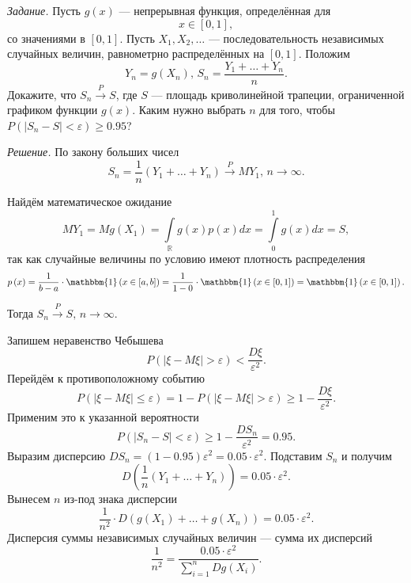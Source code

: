 \textit{Задание.}
Пусть $g \left( x \right) $ --- непрерывная функция, определённая для
$$x \in
  \left[ 0, 1 \right],$$
со значениями в $ \left[ 0, 1 \right]$.
Пусть $X_1, X_2, \dotsc $ --- последовательность независимых случайных величин,
равнометрно распределённых на $ \left[ 0, 1 \right]$.
Положим
$$Y_n = g \left( X_n \right), \,
  S_n = \frac{Y_1 + \dotsc + Y_n}{n}.$$
Докажите, что $S_n \overset{P}{ \rightarrow } S$, где $S$ --- площадь криволинейной трапеции,
ограниченной графиком функции $g \left( x \right)$.
Каким нужно выбрать $n$ для того,
чтобы $P \left( \left| S_n - S \right| < \varepsilon \right) \geq 0.95$?

\textit{Решение.} По закону больших чисел
$$S_n =
  \frac{1}{n} \left( Y_1 + \dotsc + Y_n \right) \overset{P}{ \rightarrow } MY_1, \,
  n \to \infty.$$

Найдём математическое ожидание
$$MY_1 =
  Mg \left( X_1 \right) =
  \int \limits_{ \mathbb{R}} g \left( x \right) p \left( x \right) dx =
  \int \limits_0^1 g \left( x \right) dx =
  S,$$
так как случайные величины по условию имеют плотность распределения
$$p \left( x \right) =
  \frac{1}{b - a} \cdot \mathbbm{1} \left( x \in \left[ a, b \right] \right) =
  \frac{1}{1 - 0} \cdot \mathbbm{1} \left( x \in \left[ 0, 1 \right] \right) =
  \mathbbm{1} \left( x \in \left[ 0, 1 \right] \right).$$

Тогда $S_n \overset{P}{ \rightarrow } S, \, n \to \infty $.

Запишем неравенство Чебышева
$$P \left( \left| \xi - M \xi \right| > \varepsilon \right) <
  \frac{D \xi }{ \varepsilon^2}.$$
Перейдём к противоположному событию
$$P \left( \left| \xi - M \xi \right| \leq \varepsilon \right) =
  1 - P \left( \left| \xi - M \xi \right| > \varepsilon \right) \geq
  1 - \frac{D \xi }{ \varepsilon^2}.$$
Применим это к указанной вероятности
$$P \left( \left| S_n - S \right| < \varepsilon \right) \geq
  1 - \frac{DS_n}{ \varepsilon^2} =
  0.95.$$
Выразим дисперсию $DS_n = \left( 1 - 0.95 \right) \varepsilon^2 = 0.05 \cdot \varepsilon^2$.
Подставим $S_n$ и получим
$$ D \left( \frac{1}{n} \left( Y_1 + \dotsc + Y_n \right) \right) =
  0.05 \cdot \varepsilon^2.$$
Вынесем $n$ из-под знака дисперсии
$$ \frac{1}{n^2} \cdot D \left( g \left( X_1 \right) + \dotsc + g \left( X_n \right) \right) =
  0.05 \cdot \varepsilon^2.$$
Дисперсия суммы независимых случайных величин --- сумма их дисперсий
$$ \frac{1}{n^2 } =
  \frac{0.05 \cdot \varepsilon^2}{ \sum \limits_{i = 1}^n Dg \left( X_i \right) }.$$

